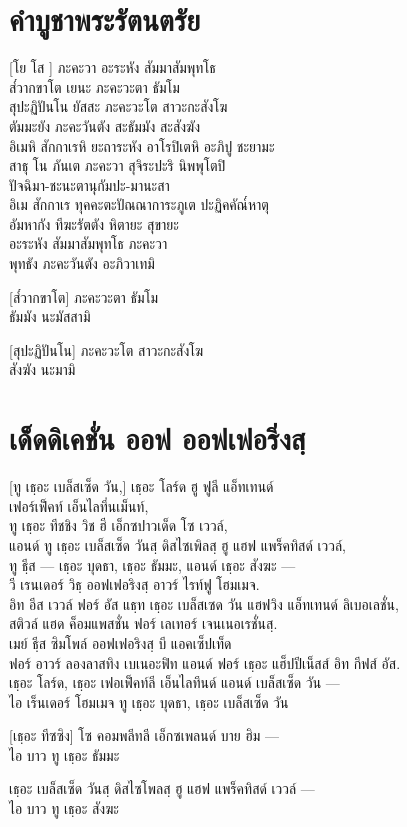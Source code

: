 \chapter*{คำบูชาพระรัตนตรัย}
\delegateSetUseNext

[โย โส ] ภะคะวา อะระหัง สัมมาสัมพุทโธ\\
ส๎วากขาโต เยนะ ภะคะวะตา ธัมโม\\
สุปะฏิปันโน  ยัสสะ ภะคะวะโต สาวะกะสังโฆ\\
ตัมมะยัง ภะคะวันตัง สะธัมมัง สะสังฆัง\\
อิเมหิ สักกาเรหิ ยะถาระหัง อาโรปิเตหิ อะภิปู ชะยามะ\\
สาธุ โน ภันเต ภะคะวา สุจิระปะริ นิพพุโตปิ\\
ปัจฉิมา-ชะนะตานุกัมปะ-มานะสา\\
อิเม สักกาเร ทุคคะตะปัณณาการะภูเต ปะฏิคคัณ๎หาตุ\\
อัมหากัง ทีฆะรัตตัง หิตายะ สุขายะ\\

อะระหัง สัมมาสัมพุทโธ ภะคะวา\\
พุทธัง ภะคะวันตัง อะภิวาเทมิ

[ส๎วากขาโต] ภะคะวะตา ธัมโม\\
ธัมมัง นะมัสสามิ 

[สุปะฏิปันโน] ภะคะวะโต สาวะกะสังโฆ\\
สังฆัง นะมามิ 
\clearpage

\chapter{เด็ดดิเคชั่น ออฟ ออฟเฟอริ่งสฺ}

\begin{english}
[ทู เธฺอะ เบล็สเซ็ด วัน,] เธฺอะ โลร์ด ฮู ฟูลี แอ็ทเทนด์\\
    เฟอร์เฟ็คท์ เอ็นไลทึ่นเม็นท์,\\
ทู เธฺอะ ทีชชิง วิช ฮี เอ็กซปาวเด็ด โซ เววล์,\\
แอนด์ ทู เธฺอะ เบล็สเซ็ด วันสฺ ดิสไซเพิลสฺ ฮู แฮฟ แพร็คทิสด์ เววล์,\\
ทู ธีฺส — เธฺอะ บุดธา, เธฺอะ ธัมมะ, แอนด์ เธฺอะ สังฆะ —\\
วี เรนเดอร์ วิธฺ ออฟเฟอริงสฺ อาวร์ ไรท์ฟู โฮมเมจ.\\
อิท อีส เววล์ ฟอร์ อัส แธฺท เธฺอะ เบล็สเซด วัน แฮฟวิง แอ็ทเทนด์ ลิเบอเลชั่น,\\
สติวล์ แฮด ค็อมแพสชั่น ฟอร์ เลเทอร์ เจนเนอเรชั่นสฺ.\\
เมย์ ธีฺส ซิมโพล์ ออฟเฟอริงสฺ บี แอคเซ็ปเท็ด\\
ฟอร์ อาวร์ ลองลาสทิง เบเนอะฟิท แอนด์ ฟอร์ เธฺอะ แฮ็ปปีเน็สส์ อิท กีฟส์ อัส.\\
เธฺอะ โลร์ด, เธฺอะ เฟอเฟ็คท์ลี เอ็นไลทึนด์ แอนด์ เบล็สเซ็ด วัน —\\
ไอ เร็นเดอร์ โฮมเมจ ทู เธฺอะ บุดธา, เธฺอะ เบล็สเซ็ด วัน

[เธฺอะ ทีซซิง] โซ คอมพลีทลี เอ็กซเพลนด์ บาย ฮิม —\\
ไอ บาว ทู เธฺอะ ธัมมะ

เธฺอะ เบล็สเซ็ด วันสฺ ดิสไซโพลสฺ ฮู แฮฟ แพร็คทิสด์ เววล์ —\\
ไอ บาว ทู เธฺอะ สังฆะ
\end{english}
\clearpage

